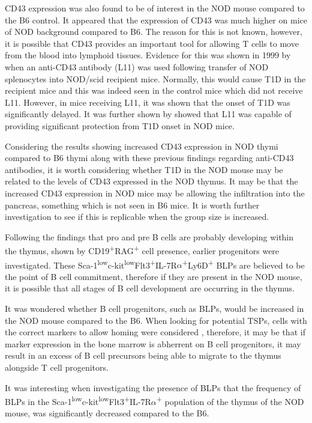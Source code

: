 CD43 expression was also found to be of interest in the NOD mouse compared to the B6 control.
It appeared that the expression of CD43 was much higher on mice of NOD background compared to B6.
The reason for this is not known, however, it is possible that CD43 provides an important tool for allowing T cells to move from the blood into lymphoid tissues.
Evidence for this was shown in 1999 by \citet{Mikulowska1999} when an anti-CD43 antibody (L11) was used following transfer of NOD splenocytes into NOD/scid recipient mice. 
Normally, this would cause T1D in the recipient mice and this was indeed seen in the control mice which did not receive L11.
However, in mice receiving L11, it was shown that the onset of T1D was significantly delayed.
It was further shown by \citet{Johnson1999} showed that L11 was capable of providing significant protection from T1D onset in NOD mice.

Considering the results showing increased CD43 expression in NOD thymi compared to B6 thymi along with these previous findings regarding anti-CD43 antibodies, it is worth considering whether T1D in the NOD mouse may be related to the levels of CD43 expressed in the NOD thymus.
It may be that the increased CD43 expression in NOD mice may be allowing the infiltration into the pancreas, something which is not seen in B6 mice.
It is worth further investigation to see if this is replicable when the group size is increased.


Following the findings that pro and pre B cells are probably developing within the thymus, shown by CD19\textsuperscript{+}RAG\textsuperscript{+} cell presence, earlier progenitors were investigated.
These Sca-1\textsuperscript{low}c-kit\textsuperscript{low}Flt3\textsuperscript{+}IL-7R$\alpha$\textsuperscript{+}Ly6D\textsuperscript{+} BLPs are believed to be the point of B cell commitment, therefore if they are present in the NOD mouse, it is possible that all stages of B cell development are occurring in the thymus.

It was wondered whether B cell progenitors, such as BLPs, would be increased in the NOD mouse compared to the B6.
When looking for potential TSPs, cells with the correct markers to allow homing were considered \citep{Zlotoff2011}, therefore, it may be that if marker expression in the bone marrow is abherrent on B cell progenitors, it may result in an excess of B cell precursors being able to migrate to the thymus alongside T cell progenitors.

It was interesting when investigating the presence of BLPs that the frequency of BLPs in the Sca-1\textsuperscript{low}c-kit\textsuperscript{low}Flt3\textsuperscript{+}IL-7R$\alpha$\textsuperscript{+} population of the thymus of the NOD mouse, was significantly decreased compared to the B6.

